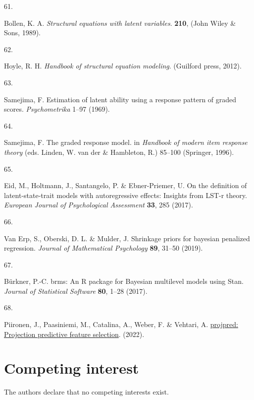 \documentclass[
  man,floatsintext]{apa6}
\newlength{\cslhangindent}
\newlength{\csllabelwidth}
\newlength{\cslentryspacingunit} %
\newenvironment{CSLReferences}[2] %
 {%
  \setlength{\parindent}{0pt}
  \ifodd #1
  \let\oldpar\par
  \def\par{\hangindent=\cslhangindent\oldpar}
  \fi
  \setlength{\parskip}{#2\cslentryspacingunit}
 }%
 {}
\newcommand{\CSLLeftMargin}[1]{\parbox[t]{\csllabelwidth}{#1}}
\newcommand{\CSLRightInline}[1]{\parbox[t]{\linewidth - \csllabelwidth}{#1}\break}
\begin{document}
\begin{CSLReferences}{0}{0}
\leavevmode{}%
\CSLLeftMargin{61. }%
\CSLRightInline{Bollen, K. A. \emph{Structural equations with latent variables}. \textbf{210}, (John Wiley \& Sons, 1989).}

\leavevmode{}%
\CSLLeftMargin{62. }%
\CSLRightInline{Hoyle, R. H. \emph{Handbook of structural equation modeling}. (Guilford press, 2012).}

\leavevmode{}%
\CSLLeftMargin{63. }%
\CSLRightInline{Samejima, F. Estimation of latent ability using a response pattern of graded scores. \emph{Psychometrika} 1--97 (1969).}

\leavevmode{}%
\CSLLeftMargin{64. }%
\CSLRightInline{Samejima, F. The graded response model. in \emph{Handbook of modern item response theory} (eds. Linden, W. van der \& Hambleton, R.) 85--100 (Springer, 1996).}

\leavevmode{}%
\CSLLeftMargin{65. }%
\CSLRightInline{Eid, M., Holtmann, J., Santangelo, P. \& Ebner-Priemer, U. On the definition of latent-state-trait models with autoregressive effects: Insights from LST-r theory. \emph{European Journal of Psychological Assessment} \textbf{33}, 285 (2017).}

\leavevmode{}%
\CSLLeftMargin{66. }%
\CSLRightInline{Van Erp, S., Oberski, D. L. \& Mulder, J. Shrinkage priors for bayesian penalized regression. \emph{Journal of Mathematical Psychology} \textbf{89}, 31--50 (2019).}

\leavevmode{}%
\CSLLeftMargin{67. }%
\CSLRightInline{Bürkner, P.-C. {brms}: An {R} package for {Bayesian} multilevel models using {Stan}. \emph{Journal of Statistical Software} \textbf{80}, 1--28 (2017).}

\leavevmode{}%
\CSLLeftMargin{68. }%
\CSLRightInline{Piironen, J., Paasiniemi, M., Catalina, A., Weber, F. \& Vehtari, A. \href{https://mc-stan.org/projpred/}{{projpred}: Projection predictive feature selection}. (2022).}

\end{CSLReferences}

\endgroup

\newpage

\hypertarget{competing-interest}{%
\section{Competing interest}\label{competing-interest}}

The authors declare that no competing interests exist.
\end{document}
